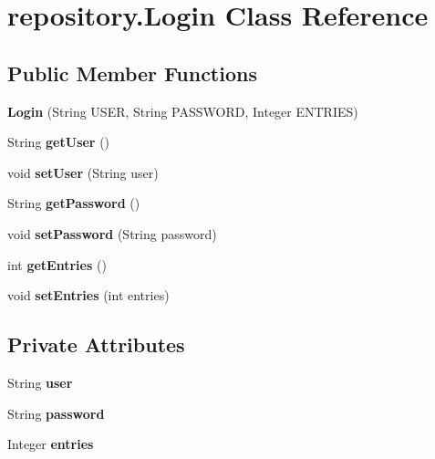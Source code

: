 \hypertarget{classrepository_1_1_login}{}\section{repository.\+Login Class Reference}
\label{classrepository_1_1_login}
\subsection*{Public Member Functions}
\begin{DoxyCompactItemize}
\item 
\mbox{\label{classrepository_1_1_login_ababa5af80cdb4d50abe015dffb12c4c5}} 
{\bfseries Login} (String U\+S\+ER, String P\+A\+S\+S\+W\+O\+RD, Integer E\+N\+T\+R\+I\+ES)
\item 
\mbox{\label{classrepository_1_1_login_aa6b51b0bdf3ca3a4fb0302fa0fcaffae}} 
String {\bfseries get\+User} ()
\item 
\mbox{\label{classrepository_1_1_login_a59c6ddb4c4f5abaf55b21e60f228ae1b}} 
void {\bfseries set\+User} (String user)
\item 
\mbox{\label{classrepository_1_1_login_a24b9bb126a7f82dfd2dad0ead620a008}} 
String {\bfseries get\+Password} ()
\item 
\mbox{\label{classrepository_1_1_login_ae536ef7ca6cf8ea7c2f63ffcfbceb599}} 
void {\bfseries set\+Password} (String password)
\item 
\mbox{\label{classrepository_1_1_login_adacd1ec1b6048ff6cadb60338daa9cc6}} 
int {\bfseries get\+Entries} ()
\item 
\mbox{\label{classrepository_1_1_login_a60c3e0981a3d63ff1739ec37cc5afbc8}} 
void {\bfseries set\+Entries} (int entries)
\end{DoxyCompactItemize}
\subsection*{Private Attributes}
\begin{DoxyCompactItemize}
\item 
\mbox{\label{classrepository_1_1_login_a94a7cbdf76ab97ac385017645758ac3d}} 
String {\bfseries user}
\item 
\mbox{\label{classrepository_1_1_login_ac4b446913771c7a5074422e4d6f6de84}} 
String {\bfseries password}
\item 
\mbox{\label{classrepository_1_1_login_a65e0f899ed71cb70847ee88d33094437}} 
Integer {\bfseries entries}
\end{DoxyCompactItemize}


